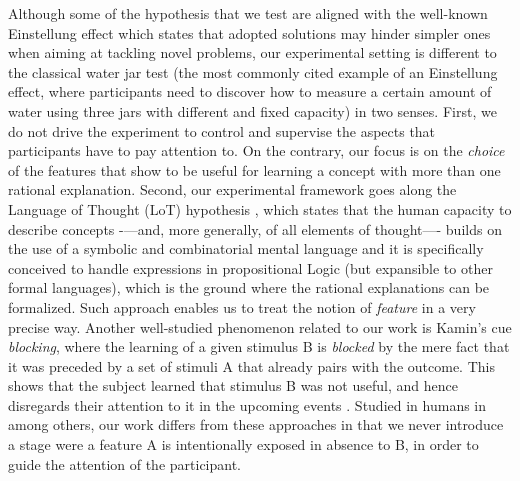 Although some of the hypothesis that we test are aligned with the well-known Einstellung effect \cite{luchins1942mechanization} which states that adopted solutions may hinder simpler ones when aiming at tackling novel problems, our experimental setting is different to the classical water jar test 
\color{blue}
(the most commonly cited example of an Einstellung effect, where participants need to discover how to measure a certain amount of water using three jars with different and fixed capacity)
\color{black}
in two senses. First, we do not drive the experiment to control and supervise the aspects that participants have to pay attention to. On the contrary, our focus is on the {\em choice} of the features that show to be useful for learning a concept with more than one rational explanation. Second, our experimental framework goes along the \color{blue} Language of Thought (LoT) hypothesis \cite{fodor1975language}, which states that the human capacity to describe concepts -—and, more generally, of all elements of thought—- builds on the use of a symbolic and combinatorial mental language
\color{black}
and it is specifically conceived to handle expressions in propositional Logic (but expansible to other formal languages), which is the ground where the rational explanations can be formalized. Such approach enables us to treat the notion of {\em feature} in a very precise way. Another well-studied phenomenon related to our work is Kamin’s cue {\em blocking}, where the learning of a given stimulus B is {\em blocked} by the mere fact that it was preceded by a set of stimuli A that already pairs with the outcome. This shows that the subject learned that stimulus B was not useful, and hence disregards their attention to it in the upcoming events \cite{wagner1970stimulus,mackintosh1975theory,rescorlaw72}. Studied in humans in \cite{chapman1990cue, arcediano1997blocking, kruschke2000blocking} among others, our work differs from these approaches in that we never introduce a stage were a feature A is intentionally exposed in absence to B, in order to guide the attention of the participant. %
\color{black}



